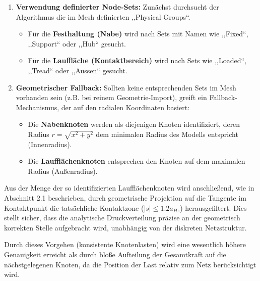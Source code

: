 \begin{enumerate}
    \item \textbf{Verwendung definierter Node-Sets:} 
    Zunächst durchsucht der Algorithmus die im Mesh definierten ,,Physical Groups``. 
    \begin{itemize}
        \item Für die \textbf{Festhaltung (Nabe)} wird nach Sets mit Namen wie ,,Fixed``, ,,Support`` oder ,,Hub`` gesucht.
        \item Für die \textbf{Lauffläche (Kontaktbereich)} wird nach Sets wie ,,Loaded``, ,,Tread`` oder ,,Aussen`` gesucht.
    \end{itemize}
    
    \item \textbf{Geometrischer Fallback:} 
    Sollten keine entsprechenden Sets im Mesh vorhanden sein (z.B. bei reinem Geometrie-Import), greift ein Fallback-Mechanismus, der auf den radialen Koordinaten basiert:
    \begin{itemize}
        \item Die \textbf{Nabenknoten} werden als diejenigen Knoten identifiziert, deren Radius $r = \sqrt{x^2+y^2}$ dem minimalen Radius des Modells entspricht (Innenradius).
        \item Die \textbf{Laufflächenknoten} entsprechen den Knoten auf dem maximalen Radius (Außenradius).
    \end{itemize}
\end{enumerate}

Aus der Menge der so identifizierten Laufflächenknoten wird anschließend, wie in Abschnitt 2.1 beschrieben, durch geometrische Projektion auf die Tangente im Kontaktpunkt die tatsächliche Kontaktzone ($|s| \le 1.2 a_{Hz}$) herausgefiltert. Dies stellt sicher, dass die analytische Druckverteilung präzise an der geometrisch korrekten Stelle aufgebracht wird, unabhängig von der diskreten Netzstruktur.

Durch dieses Vorgehen (konsistente Knotenlasten) wird eine wesentlich höhere Genauigkeit erreicht als durch bloße Aufteilung der Gesamtkraft auf die nächstgelegenen Knoten, da die Position der Last relativ zum Netz berücksichtigt wird.
